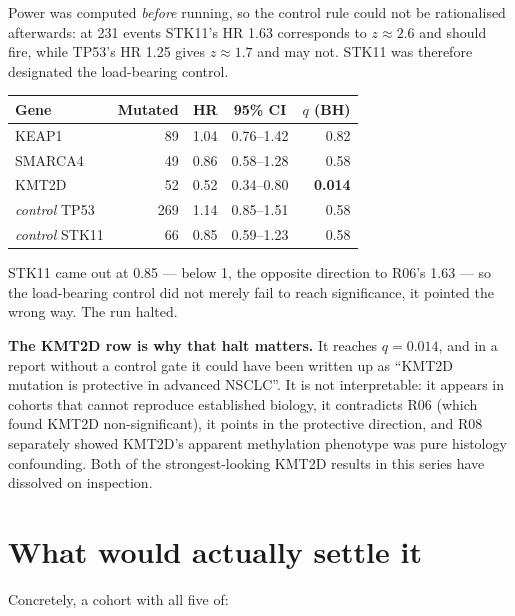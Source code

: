 \documentclass[11pt,a4paper]{article}
\begin{document}
Power was computed \emph{before} running, so the control rule could not be rationalised
afterwards: at 231 events STK11's HR 1.63 corresponds to $z\approx2.6$ and should fire, while
TP53's HR 1.25 gives $z\approx1.7$ and may not. STK11 was therefore designated the load-bearing
control.

\begin{center}
\begin{tabular}{@{}lrrcr@{}}
\toprule
\textbf{Gene} & \textbf{Mutated} & \textbf{HR} & \textbf{95\% CI} & \textbf{$q$ (BH)} \\
\midrule
KEAP1   & \phantom{0}89 & 1.04 & 0.76--1.42 & 0.82 \\
SMARCA4 & \phantom{0}49 & 0.86 & 0.58--1.28 & 0.58 \\
KMT2D   & \phantom{0}52 & 0.52 & 0.34--0.80 & \textbf{0.014} \\
\midrule
\textit{control} TP53  & 269 & 1.14 & 0.85--1.51 & 0.58 \\
\textit{control} STK11 & \phantom{0}66 & 0.85 & 0.59--1.23 & 0.58 \\
\bottomrule
\end{tabular}
\end{center}

STK11 came out at 0.85 --- below 1, the opposite direction to R06's 1.63 --- so the load-bearing
control did not merely fail to reach significance, it pointed the wrong way. The run halted.

\textbf{The KMT2D row is why that halt matters.} It reaches $q=0.014$, and in a report without a
control gate it could have been written up as ``KMT2D mutation is protective in advanced NSCLC''.
It is not interpretable: it appears in cohorts that cannot reproduce established biology, it
contradicts R06 (which found KMT2D non-significant), it points in the protective direction, and
R08 separately showed KMT2D's apparent methylation phenotype was pure histology confounding.
Both of the strongest-looking KMT2D results in this series have dissolved on inspection.

\section{What would actually settle it}

Concretely, a cohort with all five of:
\end{document}

